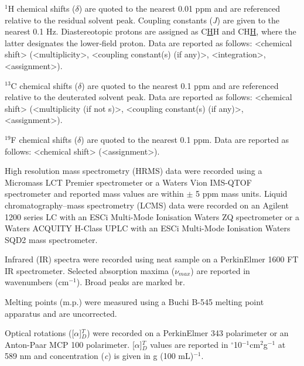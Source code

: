 $^1$H chemical shifts ($\delta$) are quoted to the nearest 0.01 ppm and are referenced relative to the residual solvent peak\cite{Gottlieb1997}. Coupling constants (\textit{J}) are given to the nearest 0.1 Hz. Diastereotopic protons are assigned as C\underline{H}H and CH\underline{H},
where the latter designates the lower‑field proton. Data are reported as follows: <chemical shift> (<multiplicity>, <coupling constant(s) (if any)>, <integration>, <assignment>).

$^{13}$C chemical shifts ($\delta$) are quoted to the nearest 0.1 ppm and are referenced relative to the deuterated solvent peak\cite{Gottlieb1997}. Data are reported as follows: <chemical shift> (<multiplicity (if not s)>, <coupling constant(s) (if any)>, <assignment>).

$^{19}$F chemical shifts ($\delta$) are quoted to the nearest 0.1 ppm. Data are reported as follows: <chemical shift> (<assignment>).

High resolution mass spectrometry (HRMS) data were recorded using a Micromass LCT Premier spectrometer or a Waters Vion IMS-QTOF spectrometer and reported mass values are within $\pm$ 5 ppm mass units. Liquid chromatography–mass spectrometry (LCMS) data were recorded on an Agilent 1200 series LC with an ESCi Multi-Mode Ionisation Waters ZQ spectrometer or a Waters ACQUITY H-Class UPLC with an ESCi Multi-Mode Ionisation Waters SQD2 mass spectrometer.

Infrared (IR) spectra were recorded using neat sample on a PerkinElmer 1600 FT IR spectrometer. Selected absorption maxima ($\nu_{max}$) are reported in wavenumbers (cm$^{-1}$). Broad peaks are marked br.

Melting points (m.p.) were measured using a Buchi B-545 melting point apparatus and are uncorrected. 

Optical rotations ([$\alpha$]$_D^T$) were recorded on a PerkinElmer 343 polarimeter or an Anton-Paar MCP 100 polarimeter. [$\alpha$]$_D^T$ values are reported in $^{\circ}$10$^{-1}$cm$^2$g$^{-1}$ at 589 nm and concentration (\textit{c}) is given in g (100 mL)$^{-1}$. 




%
%

